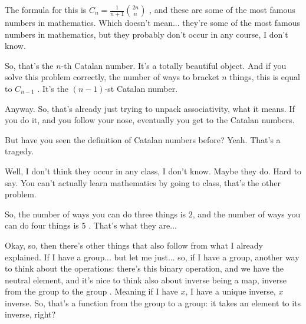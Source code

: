 \begin{speech}[00:55:39 - 00:57:49]
The formula for this is $C_n = \frac{1}{n+1} \binom{2n}{n}$ , and these are some of the most famous numbers in mathematics. Which doesn't mean... they're some of the most famous numbers in mathematics, but they probably don't occur in any course, I don't know.

So, that's the $n$-th Catalan number. It's a totally beautiful object. And if you solve this problem correctly, the number of ways to bracket $n$ things, this is equal to $C_{n-1}$ . It's the $(n-1)$-st Catalan number.

Anyway. So, that's already just trying to unpack associativity, what it means. If you do it, and you follow your nose, eventually you get to the Catalan numbers.

But have you seen the definition of Catalan numbers before?
Yeah. That's a tragedy.

Well, I don't think they occur in any class, I don't know. Maybe they do. Hard to say.
You can't actually learn mathematics by going to class, that's the other problem.

So, the number of ways you can do three things is $2$, and the number of ways you can do four things is $5$ . That's what they are...


Okay, so, then there's other things that also follow from what I already explained. If I have a group... but let me just... so, if I have a group, another way to think about the operations: there's this binary operation, and we have the neutral element, and it's nice to think also about inverse being a map, inverse from the group to the group . Meaning if I have $x$, I have a unique inverse, $x$ inverse. So, that's a function from the group to a group: it takes an element to its inverse, right?
\end{speech}

